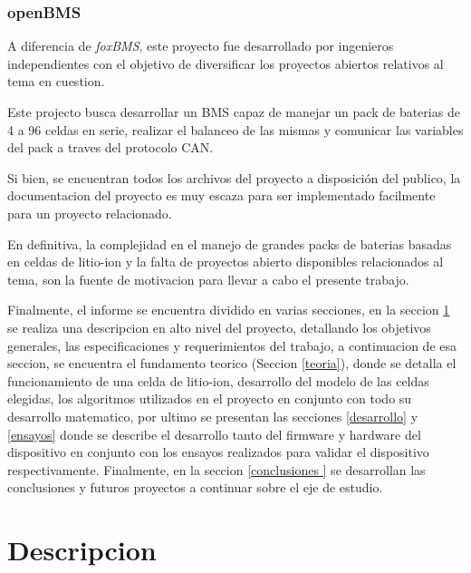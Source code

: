 \documentclass[10pt,a4paper]{article}
\begin{document}
    \clearpage

    \subsubsection{openBMS}

    \noindent A diferencia de \emph{foxBMS}, este proyecto fue desarrollado por 
    ingenieros independientes con el objetivo de diversificar los proyectos 
    abiertos relativos al tema en cuestion.
    
    \noindent Este projecto busca desarrollar un \acrshort{BMS} capaz de manejar un pack 
    de baterias de 4 a 96 celdas en serie, realizar el balanceo de las mismas y 
    comunicar las variables del pack a traves del protocolo \acrshort{CAN}.
    
    \noindent Si bien, se encuentran todos los archivos del proyecto a 
    disposición del publico, la documentacion del proyecto es muy escaza 
    para ser implementado facilmente para un proyecto relacionado.
    
    \noindent En definitiva, la complejidad en el manejo de grandes packs de 
    baterias basadas en celdas de litio-ion y la falta de proyectos abierto 
    disponibles relacionados al tema, son la fuente de motivacion para 
    llevar a cabo el presente trabajo.
    
    \noindent Finalmente, el informe se encuentra dividido en varias secciones, en la
    seccion \ref{descripcion} se realiza una descripcion en alto nivel del
    proyecto, detallando los objetivos generales, las especificaciones y
    requerimientos del trabajo, a continuacion de esa seccion, se encuentra el
    fundamento teorico (Seccion \ref{teoria}), donde se detalla el funcionamiento de una celda de
    litio-ion, desarrollo del modelo de las celdas elegidas, los algoritmos 
    utilizados en el proyecto en conjunto con todo su desarrollo matematico, por
    ultimo se presentan las secciones \ref{desarrollo} y \ref{ensayos} donde se
    describe el desarrollo tanto del firmware y hardware del dispositivo en
    conjunto con los ensayos realizados para validar el dispositivo
    respectivamente. Finalmente, en la seccion \ref{conclusiones }
    se desarrollan las conclusiones y futuros proyectos a continuar sobre el 
    eje de estudio.
	
	\clearpage
	
    \section{Descripcion}\label{descripcion}
	
\end{document}
